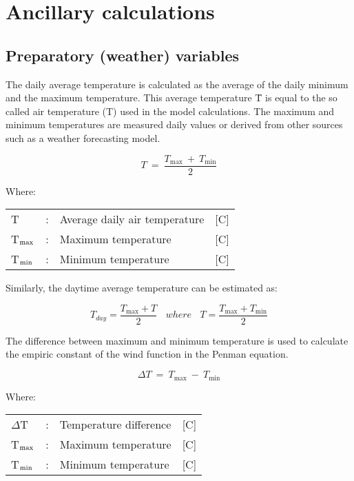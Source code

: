 \chapter{Ancillary calculations}


\section{Preparatory (weather) variables}


The daily average temperature is calculated as the average of the daily minimum and the maximum
temperature. This average temperature \={T} is equal to the so called air temperature (T) used
in the model calculations. The maximum and minimum temperatures are measured daily values or
derived from other sources such as a weather forecasting model.

\begin{equation}
T ~=~{\frac{T _{\max } ~+~ T _{\min } }{2}}
\end{equation}

Where:\\[5pt]
\begin{tabularx}{\textwidth}{llXr}
	T &:& Average daily air temperature & [\textdegree C]\\
	T$_{{\rm max}}$&:  & Maximum temperature & [\textdegree C]\\
	T$_{{\rm min}}$&: &  Minimum temperature & [\textdegree C]\\
\end{tabularx}

Similarly, the daytime average temperature can be estimated as: 

\begin{equation}
\label{eq:daytimetemp}
T_{day} = {\frac{T_{\max} + T}{2}} ~~~~ where ~~~~ T = {\frac{T_{\max } + T_{\min}}{2}}
\end{equation}

The difference between maximum and minimum temperature is used to calculate the
empiric constant of the wind function in the Penman equation.

\begin{equation}
\Delta T ~= ~T _{\max } ~-~ T _{\min } 
\end{equation}

Where:\\[5pt]
\begin{tabularx}{\textwidth}{llXr}
	$\Delta$T& :& Temperature difference  &[\textdegree C]\\
	T$_{{\rm max}}$ &:& Maximum temperature &  [\textdegree C]\\
	T$_{{\rm min}}$& :& Minimum temperature  &[\textdegree C]
\end{tabularx}


